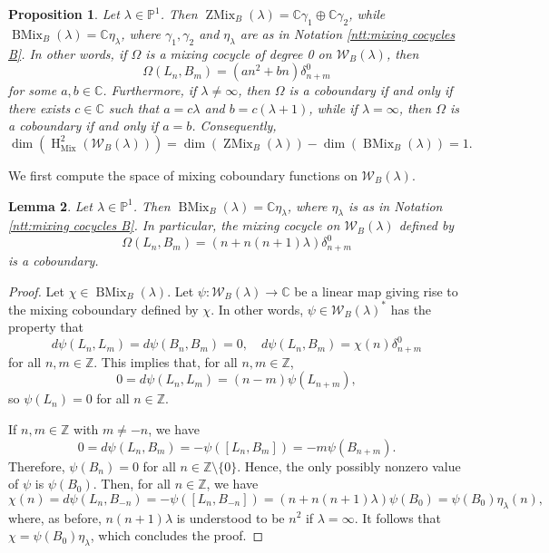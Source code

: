 \documentclass[11pt, svgnames]{amsart}
\newcommand{\ZZ}{\mathbb{Z}}
\newcommand{\CC}{\mathbb{C}}
\newcommand{\PP}{\mathbb{P}}
\newcommand{\W}{\mathcal{W}}
\DeclareMathOperator{\HH}{H}
\DeclareMathOperator{\Mix}{Mix}
\DeclareMathOperator{\ZMix}{ZMix}
\DeclareMathOperator{\BMix}{BMix}
\newcommand{\nonzero}{\setminus \{0\}}
\newtheorem{proposition}{Proposition}[section]
\newtheorem{lemma}[proposition]{Lemma}
\theoremstyle{definition}
\begin{document}
\begin{proposition}\label{prop:W_B mixing cocycles}
    Let $\lambda \in \PP^1$. Then $\ZMix_B(\lambda) = \CC \gamma_1 \oplus \CC \gamma_2$, while $\BMix_B(\lambda) = \CC \eta_\lambda$, where $\gamma_1,\gamma_2$ and $\eta_\lambda$ are as in Notation \ref{ntt:mixing cocycles B}. In other words, if $\Omega$ is a mixing cocycle of degree 0 on $\W_B(\lambda)$, then
    $$\Omega(L_n,B_m) = (an^2 + bn)\delta_{n+m}^0$$
    for some $a,b \in \CC$. Furthermore, if $\lambda \neq \infty$, then $\Omega$ is a coboundary if and only if there exists $c \in \CC$ such that $a = c\lambda$ and $b = c(\lambda + 1)$, while if $\lambda = \infty$, then $\Omega$ is a coboundary if and only if $a = b$.
    Consequently,
    $$\dim(\HH_{\Mix}^2(\W_B(\lambda))) = \dim(\ZMix_B(\lambda)) - \dim(\BMix_B(\lambda)) = 1.$$
\end{proposition}

We first compute the space of mixing coboundary functions on $\W_B(\lambda)$.

\begin{lemma}
    Let $\lambda \in \PP^1$. Then $\BMix_B(\lambda) = \CC \eta_\lambda$, where $\eta_\lambda$ is as in Notation \ref{ntt:mixing cocycles B}. In particular, the mixing cocycle on $\W_B(\lambda)$ defined by
    $$\Omega(L_n,B_m) = (n + n(n + 1)\lambda)\delta_{n+m}^0$$
    is a coboundary.
\end{lemma}
\begin{proof}
    Let $\chi \in \BMix_B(\lambda)$. Let $\psi \colon \W_B(\lambda) \to \CC$ be a linear map giving rise to the mixing coboundary defined by $\chi$. In other words, $\psi \in \W_B(\lambda)^*$ has the property that
    $$d\psi(L_n,L_m) = d\psi(B_n,B_m) = 0, \quad d\psi(L_n,B_m) = \chi(n)\delta_{n+m}^0$$
    for all $n,m \in \ZZ$. This implies that, for all $n,m \in \ZZ$,
    $$0 = d\psi(L_n,L_m) = (n - m)\psi(L_{n+m}),$$
    so $\psi(L_n) = 0$ for all $n \in \ZZ$.
    
    If $n,m \in \ZZ$ with $m \neq -n$, we have
    $$0 = d\psi(L_n,B_m) = -\psi([L_n,B_m]) = -m\psi(B_{n+m}).$$
    Therefore, $\psi(B_n) = 0$ for all $n \in \ZZ \nonzero$. Hence, the only possibly nonzero value of $\psi$ is $\psi(B_0)$. Then, for all $n \in \ZZ$, we have
    $$\chi(n) = d\psi(L_n,B_{-n}) = -\psi([L_n,B_{-n}]) = (n + n(n + 1)\lambda)\psi(B_0) = \psi(B_0)\eta_\lambda(n),$$
    where, as before, $n(n + 1)\lambda$ is understood to be $n^2$ if $\lambda = \infty$. It follows that $\chi = \psi(B_0)\eta_\lambda$, which concludes the proof.
\end{proof}
\end{document}
